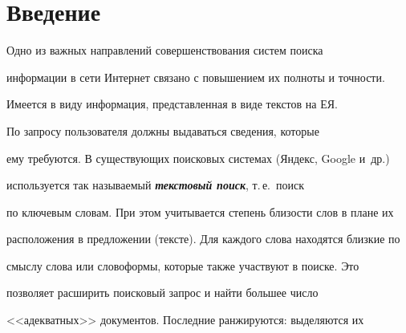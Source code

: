      















      \thispagestyle{headings}





      


            \label{st\stat}


            


            \vspace*{-12pt}


    


\section{Введение}





    Одно из важных направлений совершенствования систем поиска 


информации в сети Интернет связано с повышением их полноты и точности. 


Имеется в виду информация, представленная в виде текстов на ЕЯ. 


По запросу пользователя должны выдаваться сведения, которые 


ему требуются. В существующих поисковых системах (Яндекс, Google и~др.) 


используется так называемый {\bfseries\textit{текстовый поиск}}, т.\,е.\ поиск 


по ключевым словам. При этом учитывается степень близости слов в плане их 


расположения в предложении (тексте). Для каждого слова находятся близкие по 


смыслу слова или словоформы, которые также участвуют в поиске. Это 


позволяет расширить поисковый запрос и найти большее число 


<<адекватных>> документов. Последние ранжируются: выделяются их 


